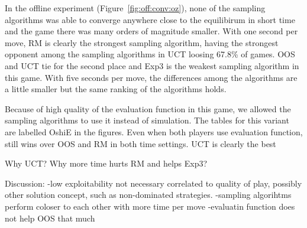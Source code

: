 In the offline experiment (Figure~\ref{fig:off:conv:oz}), none of the sampling algorithms was able to converge anywhere close to the equilibirum in short time and the game there was many orders of magnitude smaller. With one second per move, RM is clearly the strongest sampling algorithm, having the strongest opponent among the sampling algorithms in UCT loosing 67.8\% of games. OOS and UCT tie for the second place and Exp3 is the weakest sampling algorithm in this game. With five seconds per move, the differences among the algorithms are a little smaller but the same ranking of the algorithms holds.

Because of high quality of the evaluation function in this game, we allowed the sampling algorithms to use it instead of simulation. The tables for this variant are labelled OshiE in the figures. Even when both players use evaluation function, \doab still wins over OOS and RM in both time settings. UCT is clearly the best

Why UCT?
Why more time hurts RM and helps Exp3?

Discussion: 
-low exploitability not necessary correlated to quality of play, possibly other solution concept, such as non-dominated strategies.
-sampling algorihtms perform coloser to each other with more time per move
-evaluatin function does not help OOS that much
